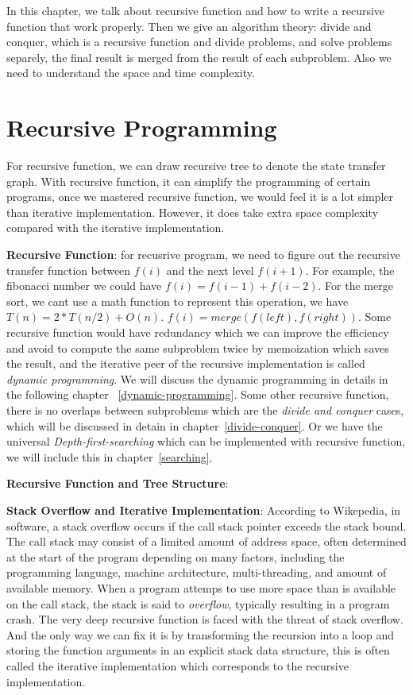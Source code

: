 \documentclass[../algorithms.tex]{subfiles}
\begin{document}
In this chapter, we talk about recursive function and how to write a recursive function that work properly. Then we give an algorithm theory: divide and conquer, which is a recursive function and divide problems, and solve problems separely, the final result is merged from the result of each subproblem. Also we need to understand the space and time complexity. 
\section{Recursive Programming}
For recursive function, we can draw recursive tree to denote the state transfer graph. With recursive function, it can simplify the programming of certain programs, once we mastered recursive function, we would feel it is a lot simpler than iterative implementation. However, it does take extra space complexity compared with the iterative implementation. 

\textbf{Recursive Function}: for recusrive program, we need to figure out the recursive transfer function between $f(i)$ and the next level $f(i+1)$. For example, the fibonacci number we could have $f(i) = f(i-1) + f(i-2)$. For the merge sort, we cant use a math function to represent this operation, we have $T(n) = 2*T(n/2) + O(n)$. $f(i) = merge(f(left), f(right))$. Some recursive function would have redundancy which we can improve the efficiency and avoid to compute the same subproblem twice by memoization which saves the result, and the iterative peer of the recursive implementation is called \textit{dynamic programming}. We will discuss the dynamic programming in details in the following chapter ~\ref{dynamic-programming}. Some other recursive function, there is no overlaps between subproblems which are the \textit{divide and conquer} cases, which will be discussed in detain in chapter~\ref{divide-conquer}. Or we have the universal \textit{Depth-first-searching} which can be implemented with recursive function, we will include this in chapter~\ref{searching}. 

\textbf{Recursive Function and Tree Structure}: 

\textbf{Stack Overflow and Iterative Implementation}: According to Wikepedia, in software, a stack overflow occurs if the call stack pointer exceeds the stack bound. The call stack may consist of a limited amount of address space, often determined at the start of the program depending on many factors, including the programming language, machine architecture, multi-threading, and amount of available memory. When a program attemps to use more space than is available on the call stack, the stack is said to \textit{overflow}, typically resulting in a program crash. The very deep recursive function is faced with the threat of stack overflow. And the only way we can fix it is by transforming the recursion into a loop and storing the function arguments in an explicit stack data structure, this is often called the iterative implementation which corresponds to the recursive implementation. 
\end{document}
